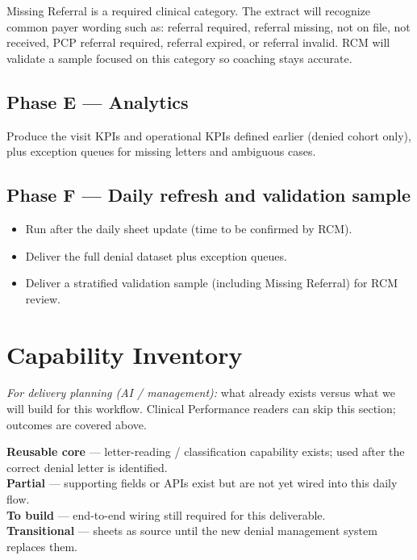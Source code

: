 \documentclass[11pt,a4paper]{article}
\newcommand{\statusReuse}{\textcolor{SuccessGreen}{\textbf{Reusable core}}}
\newcommand{\statusPartial}{\textcolor{AccentGold}{\textbf{Partial}}}
\newcommand{\statusBuild}{\textcolor{DangerRed}{\textbf{To build}}}
\newcommand{\statusTrans}{\textcolor{AccentTeal}{\textbf{Transitional}}}
\begin{document}
Missing Referral is a required clinical category. The extract will recognize common payer
wording such as: referral required, referral missing, not on file, not received,
PCP referral required, referral expired, or referral invalid. RCM will validate a sample
focused on this category so coaching stays accurate.

\subsection{Phase E --- Analytics}

Produce the visit KPIs and operational KPIs defined earlier (denied cohort only), plus
exception queues for missing letters and ambiguous cases.

\subsection{Phase F --- Daily refresh and validation sample}

\begin{itemize}
  \item Run after the daily sheet update (time to be confirmed by RCM).
  \item Deliver the full denial dataset plus exception queues.
  \item Deliver a stratified validation sample (including Missing Referral) for RCM review.
\end{itemize}


\section{Capability Inventory}

\textit{For delivery planning (AI / management):} what already exists versus what we will
build for this workflow. Clinical Performance readers can skip this section; outcomes are
covered above.

\begin{tcolorbox}[warnbox,title={Status legend}]
\statusReuse{} --- letter-reading / classification capability exists; used after the correct
denial letter is identified.\\
\statusPartial{} --- supporting fields or APIs exist but are not yet wired into this daily flow.\\
\statusBuild{} --- end-to-end wiring still required for this deliverable.\\
\statusTrans{} --- sheets as source until the new denial management system replaces them.
\end{tcolorbox}
\end{document}
